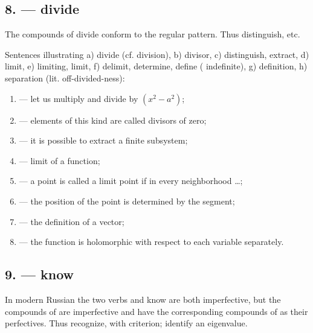 \subsection*{8.  --- divide}

The compounds of  divide conform to the regular pattern. Thus  distinguish, etc.

Sentences illustrating a)  divide (cf.  division), b)  divisor, c)  distinguish, extract, d)  limit, e)  limiting, limit, f)  delimit, determine, define ( indefinite), g)  definition, h)  separation (lit. off-divided-ness):

\begin{enumerate}[label=\alph*)]
\item {} --- let us multiply and divide by $(x^2-a^2)$;
\item {} --- elements of this kind are called divisors of zero;
\item {} --- it is possible to extract a finite subsystem;
\item {} --- limit of a function;
\item {} --- a point is called a limit point if in every neighborhood \ldots;
\item {} --- the position of the point is determined by the segment;
\item {} --- the definition of a vector;
\item {} --- the function is holomorphic with respect to each variable separately.
\end{enumerate}

\subsection*{9.  --- know}

In modern Russian the two verbs  and  know are both imperfective, but the compounds of  are imperfective and have the corresponding compounds of  as their perfectives. Thus  recognize, with  criterion;  identify an eigenvalue.

